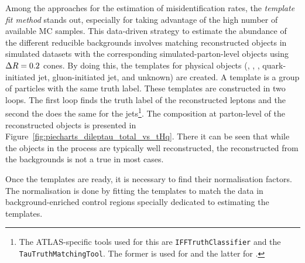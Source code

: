 Among the approaches for the estimation of misidentification rates, the \textit{template fit method} stands out, 
especially for taking advantage of the high number of available MC samples. This data-driven strategy to estimate the 
abundance of the different reducible backgrounds involves matching reconstructed objects in simulated 
datasets with the corresponding simulated-parton-level objects using $\Delta R=0.2$ cones. By doing this, the 
templates for physical objects (\Pe, \Pmu, \tauhad, quark-initiated jet, gluon-initiated jet, and unknown) 
are created. A template is a group of particles with the same truth label. These templates are constructed
in two loops. The first loop finds the truth label of the reconstructed leptons and the second the does
the same for the jets\footnote{The ATLAS-specific tools used for this are \texttt{IFFTruthClassifier} and the \texttt{TauTruthMatchingTool}. 
The former is used for \emu and the latter for \tauhad.}. 
The composition at parton-level of the reconstructed objects is presented in Figure~\ref{fig:piecharts_dileptau_total_vs_tHq}. 
There it can be seen that while the objects in the \tHq process are typically well reconstructed, the reconstructed \tauhad 
from the backgrounds is not a true \Ptau in most cases. 

Once the templates are ready, it is necessary to find their normalisation factors.
The normalisation is done by fitting the templates to match the
data in background-enriched control regions specially dedicated to estimating the templates.



